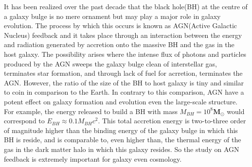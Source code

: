 \documentclass[../main.tex]{subfiles}
\begin{document}
It has been realized over the past decade that the black hole(BH) at the centre of a galaxy bulge is no mere ornament but may play a major role in galaxy evolution. The process by which this occurs is known as AGN(Active Galactic Nucleus) feedback and it takes place through an interaction between the energy and radiation generated by accretion onto the massive BH and the gas in the host galaxy. The possibility arises where the intense flux of photons and particles produced by the AGN sweeps the galaxy bulge clean of interstellar gas, terminates star formation, and through lack of fuel for acrretion, terminates the AGN. However, the ratio of the size of the BH to host galaxy is tiny and similar to coin in comparison to the Earth. In contrary to this comparison, AGN have a potent effect on galaxy formation and evolution even the large-scale structure. For example, the energy released to build a BH with mass $M_{BH}=10^{8} \mathbf{M}_{\odot}$ would correspond to $E_{BH} \approx 0.1M_{BH}c^{2}$. This total accretion energy is two-to-three order of magnitude higher than the binding energy of the galaxy bulge in which this BH is reside, and is comparable to, even higher than, the thermal energy of the gas in the dark matter halo in which this galaxy resides. So the study on AGN feedback is extremely important for galaxy even cosmology.
\end{document}
